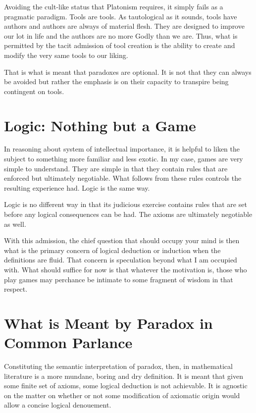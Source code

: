 \documentclass{article}
\begin{document}
	Avoiding the cult-like status that Platonism requires, it simply fails as a pragmatic paradigm. Tools are tools. As tautological as it sounds, tools have authors and authors are always of material flesh. They are designed to improve our lot in life and the authors are no more Godly than we are. Thus, what is permitted by the tacit admission of tool creation is the ability to create and modify the very same tools to our liking.
	
	That is what is meant that paradoxes are optional. It is not that they can always be avoided but rather the emphasis is on their capacity to transpire being contingent on tools.
	
	\section{Logic: Nothing but a Game}
	
	In reasoning about system of intellectual importance, it is helpful to liken the subject to something more familiar and less exotic. In my case, games are very simple to understand. They are simple in that they contain rules that are enforced but ultimately negotiable. What follows from these rules controls the resulting experience had. Logic is the same way.
	
	Logic is no different way in that its judicious exercise contains rules that are set before any logical consequences can be had. The axioms are ultimately negotiable as well.
	
	With this admission, the chief question that should occupy your mind is then what is the primary concern of logical deduction or induction when the definitions are fluid. That concern is speculation beyond what I am occupied with. What should suffice for now is that whatever the motivation is, those who play games may perchance be intimate to some fragment of wisdom in that respect.
	
	\section{What is Meant by Paradox in Common Parlance}
	
	Constituting the semantic interpretation of paradox, then, in mathematical literature is a more mundane, boring and dry definition. It is meant that given some finite set of axioms, some logical deduction is not achievable. It is agnostic on the matter on whether or not some modification of axiomatic origin would allow a concise logical denouement. 
	
\end{document}
